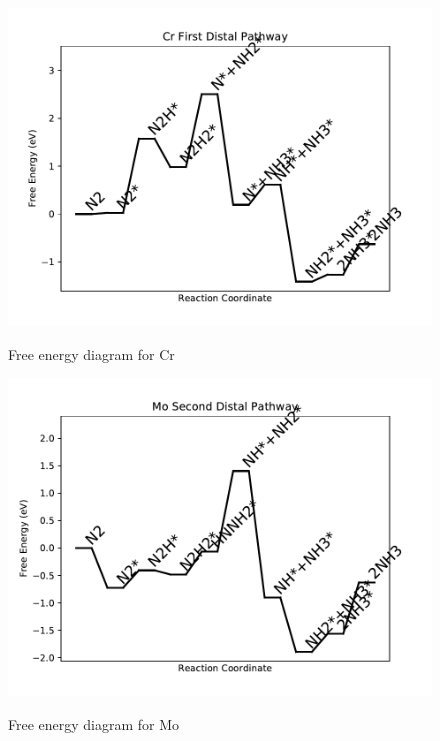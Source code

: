 \documentclass[journal=jacsat,manuscript=article]{achemso}
\begin{document}
\begin{figure}
\includegraphics[width=1\linewidth]{data/plots/Cr_distal_1.pdf}
\label{fig:Cr_distal_1}
\caption{Free energy diagram for Cr}
\end{figure}

\newpage
\begin{figure}
\includegraphics[width=1\linewidth]{data/plots/Mo_distal_2.pdf}
\label{fig:Mo_distal_2}
\caption{Free energy diagram for Mo}
\end{figure}
\end{document}
